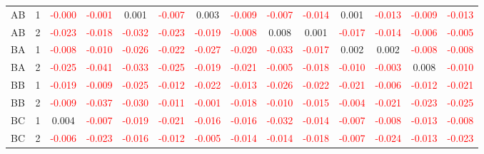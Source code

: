 \begin{table}[!htb]
{\begin{tabular}{llcccccccccccc}
AB & 1 & \textcolor{red}{-0.000} & \textcolor{red}{-0.001} & 0.001 & \textcolor{red}{-0.007} & 0.003 & \textcolor{red}{-0.009} & \textcolor{red}{-0.007} & \textcolor{red}{-0.014} & 0.001 & \textcolor{red}{-0.013} & \textcolor{red}{-0.009} & \textcolor{red}{-0.013}\\
AB & 2 & \textcolor{red}{-0.023} & \textcolor{red}{-0.018} & \textcolor{red}{-0.032} & \textcolor{red}{-0.023} & \textcolor{red}{-0.019} & \textcolor{red}{-0.008} & 0.008 & 0.001 & \textcolor{red}{-0.017} & \textcolor{red}{-0.014} & \textcolor{red}{-0.006} & \textcolor{red}{-0.005}\\
BA & 1 & \textcolor{red}{-0.008} & \textcolor{red}{-0.010} & \textcolor{red}{-0.026} & \textcolor{red}{-0.022} & \textcolor{red}{-0.027} & \textcolor{red}{-0.020} & \textcolor{red}{-0.033} & \textcolor{red}{-0.017} & 0.002 & 0.002 & \textcolor{red}{-0.008} & \textcolor{red}{-0.008}\\
BA & 2 & \textcolor{red}{-0.025} & \textcolor{red}{-0.041} & \textcolor{red}{-0.033} & \textcolor{red}{-0.025} & \textcolor{red}{-0.019} & \textcolor{red}{-0.021} & \textcolor{red}{-0.005} & \textcolor{red}{-0.018} & \textcolor{red}{-0.010} & \textcolor{red}{-0.003} & 0.008 & \textcolor{red}{-0.010}\\
BB & 1 & \textcolor{red}{-0.019} & \textcolor{red}{-0.009} & \textcolor{red}{-0.025} & \textcolor{red}{-0.012} & \textcolor{red}{-0.022} & \textcolor{red}{-0.013} & \textcolor{red}{-0.026} & \textcolor{red}{-0.022} & \textcolor{red}{-0.021} & \textcolor{red}{-0.006} & \textcolor{red}{-0.012} & \textcolor{red}{-0.021}\\
BB & 2 & \textcolor{red}{-0.009} & \textcolor{red}{-0.037} & \textcolor{red}{-0.030} & \textcolor{red}{-0.011} & \textcolor{red}{-0.001} & \textcolor{red}{-0.018} & \textcolor{red}{-0.010} & \textcolor{red}{-0.015} & \textcolor{red}{-0.004} & \textcolor{red}{-0.021} & \textcolor{red}{-0.023} & \textcolor{red}{-0.025}\\
BC & 1 & 0.004 & \textcolor{red}{-0.007} & \textcolor{red}{-0.019} & \textcolor{red}{-0.021} & \textcolor{red}{-0.016} & \textcolor{red}{-0.016} & \textcolor{red}{-0.032} & \textcolor{red}{-0.014} & \textcolor{red}{-0.007} & \textcolor{red}{-0.008} & \textcolor{red}{-0.013} & \textcolor{red}{-0.008}\\
BC & 2 & \textcolor{red}{-0.006} & \textcolor{red}{-0.023} & \textcolor{red}{-0.016} & \textcolor{red}{-0.012} & \textcolor{red}{-0.005} & \textcolor{red}{-0.014} & \textcolor{red}{-0.014} & \textcolor{red}{-0.018} & \textcolor{red}{-0.007} & \textcolor{red}{-0.024} & \textcolor{red}{-0.013} & \textcolor{red}{-0.023}\\

\end{tabular}}
\end{table}
